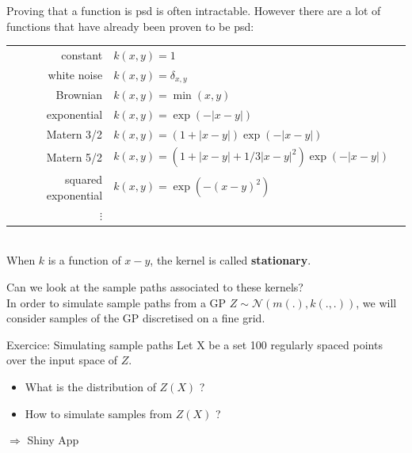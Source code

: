 \documentclass{beamer}
\begin{document}
\begin{frame}{}
Proving that a function is psd is often intractable. However there are a lot of functions that have already been proven to be psd:\\
\vspace{2mm}
\footnotesize
\begin{tabular}{rlN}
		constant & $ \displaystyle k(x,y) = 1 $ &\\[4mm]
		white noise & $ \displaystyle k(x,y) = \delta_{x,y} $ &\\[4mm]
		Brownian & $ \displaystyle k(x,y) =  \min (x,y) $ &\\[4mm]
		exponential & $\displaystyle k(x,y) = \exp \left(- |x-y| \right)$ &\\[4mm]
		Matern 3/2 & $\displaystyle k(x,y) = \left(1 + |x-y| \right) \exp \left(- |x-y| \right)$ &\\[4mm]
		Matern 5/2 & $\displaystyle k(x,y) = \left(1 + |x-y| + 1/3|x-y|^2 \right) \exp \left(- |x-y| \right)$ &\\[4mm]
		squared exponential & $\displaystyle k(x,y) = \exp \left(- (x-y)^2 \right)$ &\\[4mm]
		$\vdots$ & 
\end{tabular}\\
\vspace{2mm}
\normalsize
When $k$ is a function of $x-y$, the kernel is called \textbf{stationary}.
\end{frame}

\begin{frame}{}
Can we look at the sample paths associated to these kernels?\\
\vspace{5mm}
In order to simulate sample paths from a GP $Z \sim \mathcal{N}(m(.),k(.,.))$, we will consider samples of the GP discretised on a fine grid.
\vspace{5mm}
\begin{exampleblock}{Exercice: Simulating sample paths}
Let X be a set 100 regularly spaced points over the input space of $Z$.
\begin{itemize}
	\item What is the distribution of $Z(X)$ ?
	\item How to simulate samples from $Z(X)$ ?
\end{itemize}
\end{exampleblock}
\vspace{5mm}
$\Rightarrow$ Shiny App
\end{frame}
\end{document}
